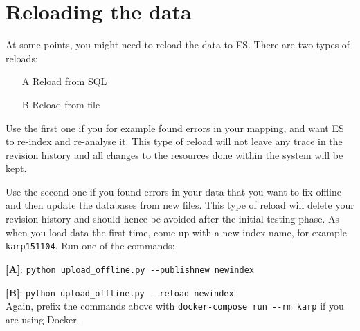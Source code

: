 \documentclass[
12pt, %
a4paper, %
oneside, %
headinclude,footinclude, %
BCOR0mm, %
]{scrartcl}
\begin{document}
%
%
%
%

\section{Reloading the data}
\label{sec:reload}
At some points, you might need to reload the data to ES.\@
There are two types of reloads:
\begin{itemize}
  \item[A] Reload from SQL
  \item[B] Reload from file
\end{itemize}

Use the first one if you for example found errors in your mapping, and
want ES to re-index and re-analyse it. This type of reload will not leave
any trace in the revision history and all changes to the resources done
within the system will be kept.

Use the second one if you found errors in your data that you want
to fix offline and then update the databases from new files. This type
of reload will delete your revision history and should hence be avoided
after the initial testing phase.
As when you load data the first time, come up with a new index name,
for example \verb|karp151104|.
Run one of the commands:

\textbf{[A]}:
\verb|python upload_offline.py --publishnew newindex|

\textbf{[B]}:
\verb|python upload_offline.py --reload newindex|\\
Again, prefix the commands above with
\verb|docker-compose run --rm karp|
if you are using Docker.
\end{document}
